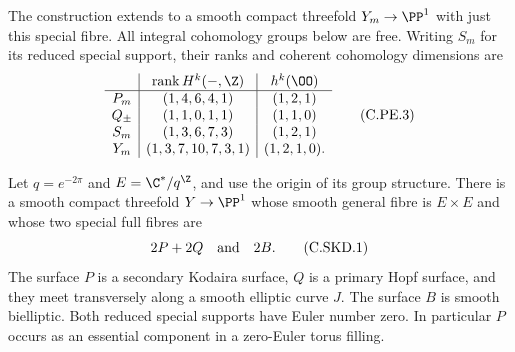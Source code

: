\begin{proposition}
The construction extends to a smooth compact threefold
$Y_m\to\PP^1$ with just this special fibre. All integral
cohomology groups below are free. Writing $S_m$ for its
reduced special support, their ranks and coherent
cohomology dimensions are
\[
 \begin{array}{c|c|c}
 &\operatorname{rank}H^k(-,\Z)&h^k(\OO)\\ \hline
 P_m&(1,4,6,4,1)&(1,2,1)\\
 Q_\pm&(1,1,0,1,1)&(1,1,0)\\
 S_m&(1,3,6,7,3)&(1,2,1)\\
 Y_m&(1,3,7,10,7,3,1)&(1,2,1,0).
 \end{array}                                           \tag{C.PE.3}\label{cdp:eq:C.PE.3}
\]
\end{proposition}

\begin{proposition}\label{cdp:st:C.2.UN.21}

Let $q=e^{-2\pi}$ and $E=\C^*/q^{\Z}$, and use the
origin of its group structure. There is a smooth compact
threefold $Y\to\PP^1$ whose smooth general fibre is
$E\times E$ and whose two special full fibres are
\[
                        2P+2Q\quad\hbox{and}\quad 2B.
                                                            \tag{C.SKD.1}\label{cdp:eq:C.SKD.1}
\]
The surface $P$ is a secondary Kodaira surface, $Q$ is
a primary Hopf surface, and they meet transversely along
a smooth elliptic curve $J$. The surface $B$ is smooth
bielliptic. Both reduced special supports have Euler
number zero. In particular $P$ occurs as an essential
component in a zero-Euler torus filling.


\end{proposition}
